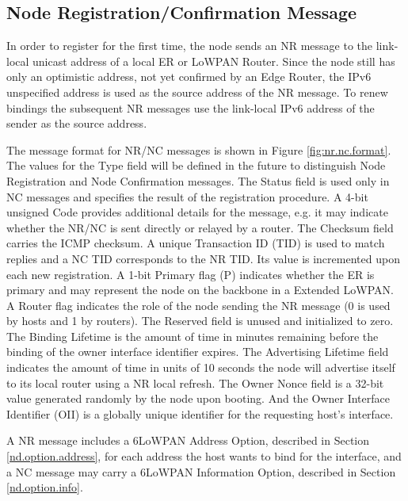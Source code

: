 \subsection{Node Registration/Confirmation Message}
In order to register for the first time, the node sends an NR message to the link-local unicast address of a local ER or LoWPAN Router. Since the node still has only an optimistic address, not yet confirmed by an Edge Router, the IPv6 unspecified address is used as the source address of the NR message. To renew bindings the subsequent NR messages use the link-local IPv6 address of the sender as the source address.

The message format for NR/NC messages is shown in Figure \ref{fig:nr.nc.format}. The values for the Type field will be defined in the future to distinguish Node Registration and Node Confirmation messages. The Status field is used only in NC messages and specifies the result of the registration procedure. A 4-bit unsigned Code provides additional details for the message, e.g. it may indicate whether the NR/NC is sent directly or relayed by a router. The Checksum field carries the ICMP checksum. A unique Transaction ID (TID) is used to match replies and a NC TID corresponds to the NR TID. Its value is incremented upon each new registration. A 1-bit Primary flag (P) indicates whether the ER is primary and may represent the node on the backbone in a Extended LoWPAN. A Router flag indicates the role of the node sending the NR message (0 is used by hosts and 1 by routers).  The Reserved field is unused and initialized to zero. The Binding Lifetime is the amount of time in minutes remaining before the binding of the owner interface identifier expires. The Advertising Lifetime field indicates the amount of time in units of 10 seconds the node will advertise itself to its local router using a NR local refresh. The Owner Nonce field is a 32-bit value generated randomly by the node upon booting.
And the Owner Interface Identifier (OII) is a globally unique identifier for the requesting host's interface.

A NR message includes a 6LoWPAN  Address Option, described in Section \ref{nd.option.address}, for each address the host wants to bind for the interface, and a NC message may carry a 6LoWPAN Information Option, described in Section \ref{nd.option.info}.

